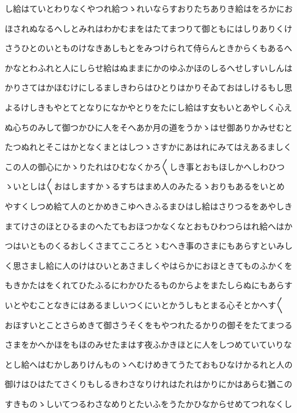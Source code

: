 \documentclass[a4paper,11pt,landscape]{ltjtarticle}
\begin{document}
\par\medskip
し給はていとわりなくやつれ給つゝれいならすおりたちありき給はをろかにお
\par\medskip
ほされぬなるへしとみれはわかむまをはたてまつりて御ともにはしりありくけ
\par\medskip
さうひとのいとものけなきあしもとをみつけられて侍らんときからくもあるへ
\par\medskip
かなとわふれと人にしらせ給はぬままにかのゆふかほのしるへせしすいしんは
\par\medskip
かりさてはかほむけにしるましきわらはひとりはかりそゐておはしけるもし思
\par\medskip
よるけしきもやとてとなりになかやとりをたにし給はす女もいとあやしく心え
\par\medskip
ぬ心ちのみして御つかひに人をそへあか月の道をうかゝはせ御ありかみせむと
\par\medskip
たつぬれとそこはかとなくまとはしつゝさすかにあはれにみてはえあるましく
\par\medskip
この人の御心にかゝりたれはひむなくかろ〱しき事とおもほしかへしわひつ
\par\medskip
ゝいとしは〱おはしますかゝるすちはまめ人のみたるゝおりもあるをいとめ
\par\medskip
やすくしつめ給て人のとかめきこゆへきふるまひはし給はさりつるをあやしき
\par\medskip
まてけさのほとひるまのへたてもおほつかなくなとおもひわつらはれ給へはか
\par\medskip
つはいとものくるおしくさまてこころとゝむへき事のさまにもあらすといみし
\par\medskip
く思さまし給に人のけはひいとあさましくやはらかにおほときてものふかくを
\par\medskip
もきかたはをくれてひたふるにわかひたるものからよをまたしらぬにもあらす
\par\medskip
いとやむことなきにはあるましいつくにいとかうしもとまる心そとかへす〱
\par\medskip
おほすいとことさらめきて御さうそくをもやつれたるかりの御そをたてまつる
\par\medskip
さまをかへかほをもほのみせたまはす夜ふかきほとに人をしつめていていりな
\par\medskip
とし給へはむかしありけんものゝへむけめきてうたておもひなけかるれと人の
\par\medskip
御けはひはたてさくりもしるきわさなりけれはたれはかりにかはあらむ猶この
\par\medskip
すきものゝしいてつるわさなめりとたいふをうたかひなからせめてつれなくし
\par\medskip
\end{document}

